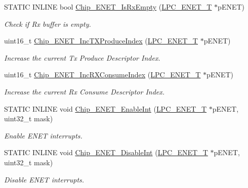 \begin{DoxyCompactItemize}
S\+T\+A\+T\+I\+C I\+N\+L\+I\+N\+E bool \hyperlink{group___e_n_e_t__17_x_x__40_x_x_ga19412cfa444b976f9ec13554da17d210}{Chip\+\_\+\+E\+N\+E\+T\+\_\+\+Is\+Rx\+Empty} (\hyperlink{struct_l_p_c___e_n_e_t___t}{L\+P\+C\+\_\+\+E\+N\+E\+T\+\_\+\+T} $\ast$p\+E\+N\+E\+T)
\begin{DoxyCompactList}\small\item\em Check if Rx buffer is empty. \end{DoxyCompactList}\item 
uint16\+\_\+t \hyperlink{group___e_n_e_t__17_x_x__40_x_x_ga9a1d6a9086bfbca3c856ad2b3b90546c}{Chip\+\_\+\+E\+N\+E\+T\+\_\+\+Inc\+T\+X\+Produce\+Index} (\hyperlink{struct_l_p_c___e_n_e_t___t}{L\+P\+C\+\_\+\+E\+N\+E\+T\+\_\+\+T} $\ast$p\+E\+N\+E\+T)
\begin{DoxyCompactList}\small\item\em Increase the current Tx Produce Descriptor Index. \end{DoxyCompactList}\item 
uint16\+\_\+t \hyperlink{group___e_n_e_t__17_x_x__40_x_x_ga4246666fbc4e9be17c45e6837a0e5dca}{Chip\+\_\+\+E\+N\+E\+T\+\_\+\+Inc\+R\+X\+Consume\+Index} (\hyperlink{struct_l_p_c___e_n_e_t___t}{L\+P\+C\+\_\+\+E\+N\+E\+T\+\_\+\+T} $\ast$p\+E\+N\+E\+T)
\begin{DoxyCompactList}\small\item\em Increase the current Rx Consume Descriptor Index. \end{DoxyCompactList}\item 
S\+T\+A\+T\+I\+C I\+N\+L\+I\+N\+E void \hyperlink{group___e_n_e_t__17_x_x__40_x_x_gac0afbb3c822a9e581416fd500b922313}{Chip\+\_\+\+E\+N\+E\+T\+\_\+\+Enable\+Int} (\hyperlink{struct_l_p_c___e_n_e_t___t}{L\+P\+C\+\_\+\+E\+N\+E\+T\+\_\+\+T} $\ast$p\+E\+N\+E\+T, uint32\+\_\+t mask)
\begin{DoxyCompactList}\small\item\em Enable E\+N\+E\+T interrupts. \end{DoxyCompactList}\item 
S\+T\+A\+T\+I\+C I\+N\+L\+I\+N\+E void \hyperlink{group___e_n_e_t__17_x_x__40_x_x_ga708d5e95e8c437779028713075a55117}{Chip\+\_\+\+E\+N\+E\+T\+\_\+\+Disable\+Int} (\hyperlink{struct_l_p_c___e_n_e_t___t}{L\+P\+C\+\_\+\+E\+N\+E\+T\+\_\+\+T} $\ast$p\+E\+N\+E\+T, uint32\+\_\+t mask)
\begin{DoxyCompactList}\small\item\em Disable E\+N\+E\+T interrupts. \end{DoxyCompactList}\item 

\end{DoxyCompactItemize}
